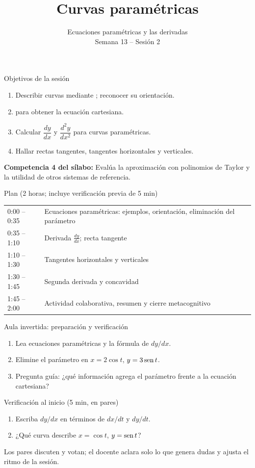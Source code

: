\documentclass[10pt,aspectratio=169]{beamer}
\title[Curvas paramétricas]{Curvas paramétricas}
\subtitle{Ecuaciones paramétricas y las derivadas\\[2pt]\small Semana 13 -- Sesión 2}
\begin{document}
\begin{frame}
  \titlepage
\end{frame}

\begin{frame}{Objetivos de la sesión}
  \begin{enumerate}
    \item Describir curvas mediante ; reconocer su orientación.
    \item {} para obtener la ecuación cartesiana.
    \item Calcular $\dfrac{dy}{dx}$ y $\dfrac{d^2y}{dx^2}$ para curvas paramétricas.
    \item Hallar rectas tangentes, tangentes horizontales y verticales.
  \end{enumerate}
  \vspace{1mm}
  {\small\textbf{Competencia 4 del sílabo:} Evalúa la aproximación con polinomios de Taylor y la utilidad de otros sistemas de referencia.}
  \begin{block}{Plan (2 horas; incluye verificación previa de 5 min)}
    \begin{tabular}{ll}
      0:00 -- 0:35 & Ecuaciones paramétricas: ejemplos, orientación, eliminación del parámetro\\
      0:35 -- 1:10 & Derivada $\frac{dy}{dx}$; recta tangente\\
      1:10 -- 1:30 & Tangentes horizontales y verticales\\
      1:30 -- 1:45 & Segunda derivada y concavidad\\
      1:45 -- 2:00 & Actividad colaborativa, resumen y cierre metacognitivo
    \end{tabular}
  \end{block}
\end{frame}

\begin{frame}{Aula invertida: preparación y verificación}
  \small
  \begin{previa}
    \begin{enumerate}
      \item Lea ecuaciones paramétricas y la fórmula de $dy/dx$.
      \item Elimine el parámetro en $x=2\cos t$, $y=3\operatorname{sen} t$.
      \item Pregunta guía: ¿qué información agrega el parámetro frente a la ecuación cartesiana?
    \end{enumerate}
  \end{previa}
  \begin{block}{Verificación al inicio (5 min, en pares)}
    \begin{enumerate}
      \item Escriba $dy/dx$ en términos de $dx/dt$ y $dy/dt$.
      \item ¿Qué curva describe $x=\cos t$, $y=\operatorname{sen} t$?
    \end{enumerate}
    Los pares discuten y votan; el docente aclara solo lo que genera dudas y ajusta el ritmo de la sesión.
  \end{block}
\end{frame}
\end{document}
